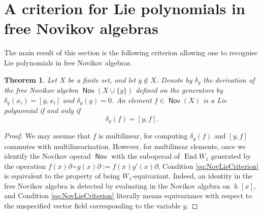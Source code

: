 \documentclass[11pt,reqno]{amsart}
\theoremstyle{plain}
\newtheorem{theorem}{Theorem}[section]
\theoremstyle{definition}
\theoremstyle{remark}
\newcommand{\bk}{\Bbbk}
\DeclareMathOperator{\Nov}{\mathsf{Nov}}
\DeclareMathOperator{\End}{End}
\begin{document}
\section{A criterion for Lie polynomials in free Novikov algebras}

The main result of this section is the following criterion allowing one to recognise Lie polynomials in free Novikov algebras. 

\begin{theorem}\label{th:criterion-main}
Let $X$ be a finite set, and let $y\notin X$. Denote by $\delta_y$ the derivation of the free Novikov algebra $\Nov(X\cup\{y\})$ defined on the generators by $\delta_y(x_i)=[y,x_i]$ and $\delta_y(y)=0$. An element  $f\in\Nov(X)$ is a Lie polynomial if and only if
\begin{equation}\label{eq:NovLieCriterion}
\delta_y(f)=[y,f].    
\end{equation}
\end{theorem}

\begin{proof}
We may assume that $f$ is multilinear, for computing $\delta_y(f)$ and $[y,f]$ commutes with multilinearization. However, for multilinear elements, once we identify the Novikov operad $\Nov$ with the suboperad of $\End{W_1}$ generated by the operation $f(x)\partial\circ g(x)\partial:=f(x)g'(x)\partial$, Condition \eqref{eq:NovLieCriterion} is equivalent to the property of being $W_1$-equivariant. Indeed, an identity in the free Novikov algebra is detected by evaluating in the Novikov algebra on $\bk[x]$, and Condition \eqref{eq:NovLieCriterion} literally means equivariance with respect to the unspecified vector field corresponding to the variable $y$.
\end{proof}
\end{document}
